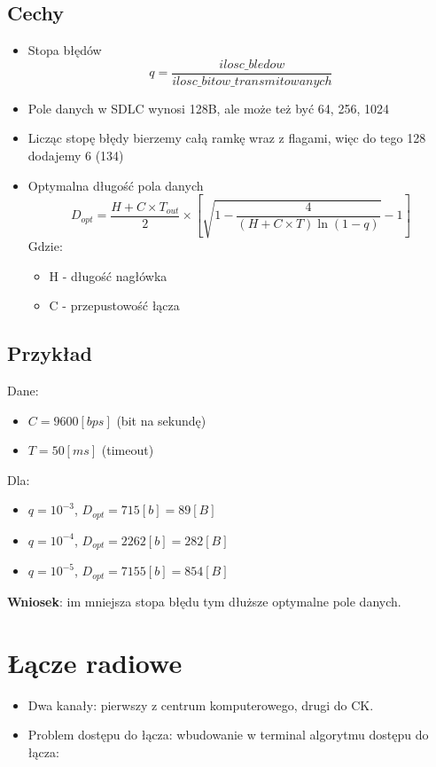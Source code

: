 \documentclass[a4paper,twoside]{article}
\begin{document}
\subsection{Cechy}
\begin{itemize}
	\item Stopa błędów 
	\begin{equation}
	q=\frac{ilosc\_bledow}{ilosc\_bitow\_transmitowanych} 
	\end{equation}
	\item Pole danych w SDLC wynosi 128B, ale może też być 64, 256, 1024
	\item Licząc stopę błędy bierzemy całą ramkę wraz z flagami, więc do tego 128 dodajemy 6 (134)
	\item Optymalna długość pola danych
	\begin{equation}
	D_{opt}=\frac{H+C\times{T_{out}}}{2}\times  [\sqrt{1-\frac{4}{(H+C\times{T})\ln{(1-q)}}}-1]
	\end{equation} 
	Gdzie:
		\begin{itemize}
			\item H - długość nagłówka
			\item C - przepustowość łącza
		\end{itemize}
\end{itemize}
\subsection{Przykład}
Dane:
\begin{itemize}
	\item $ C=9600[bps] $ (bit na sekundę)
	\item $ T=50[ms] $ (timeout)
\end{itemize}
Dla:
\begin{itemize}
	\item $ q=10^{-3} $, $ D_{opt}=715[b]=89[B] $
	\item $ q=10^{-4} $, $ D_{opt}=2262[b]=282[B] $
	\item $ q=10^{-5} $, $ D_{opt}=7155[b]=854[B] $
\end{itemize}
\textbf{Wniosek}: im mniejsza stopa błędu tym dłuższe optymalne pole danych.

\section{Łącze radiowe}
\begin{itemize}
	\item Dwa kanały: pierwszy z centrum komputerowego, drugi do CK.
	\item Problem dostępu do łącza: wbudowanie w terminal algorytmu dostępu do łącza:
\end{itemize}
\end{document}
